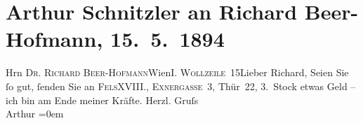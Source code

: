 

         
         \renewcommand{\erwaehntePersonen}{Personen: Richard Beer-Hofmann, Friedrich Michael Fels}
         \renewcommand{\erwaehnteOrte}{Orte: I., Innere Stadt, Krütznergasse, Wien, Wollzeile}
         \renewcommand{\erwaehnteWerke}{}
               \section[Arthur Schnitzler an Richard Beer-Hofmann, 15. 5. 1894]{ Arthur Schnitzler an Richard Beer-Hofmann, 15. 5. 1894}\nopagebreak{}\rehead{ }\begin{ledgroupsized}[t]{13cm}\normalsize\beginnumbering \toendnotes[C]{\smallbreak\pagebreak[2]} 
\pstart{}{\pb}Hrn \textsc{Dr. Richard
                     Beer-Hofmann}\pend{}\pstart{}Wien\pend{}\pstart{}\textsc{I. Wollzeile 15}\pend{}{\bigskip}\pstart{}{\pb}Lieber Richard,\pend\pstart
           Seien Sie ſo gut, ſenden Sie an \textsc{Fels}XVIII., \textsc{Exnergasse 3}, Thür 22, 3. Stock etwas Geld – ich bin am Ende meiner Kräfte.\pend
           \pstart
           Herzl. Gruſs{\\[\baselineskip]}\spacefill\mbox{Arthur}\pend
           \leftskip=0em{}
         
         \endnumbering{}\end{ledgroupsized}  \newcommand{\dateiname}{L00323}\newcommand{\titel}{Arthur Schnitzler an Richard Beer-Hofmann, 15. 5. 1894}\newcommand{\editorInnen}{Martin Anton Müller und Gerd-Hermann Susen}
      
